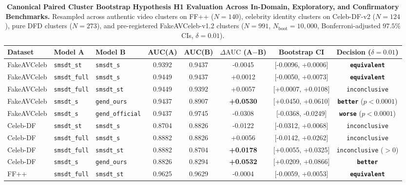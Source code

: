 \begin{table}[t]
\centering
\small
\caption{\textbf{Canonical Paired Cluster Bootstrap Hypothesis H1 Evaluation Across In-Domain, Exploratory, and Confirmatory Benchmarks.} Resampled across authentic video clusters on FF++ ($N=140$), celebrity identity clusters on Celeb-DF-v2 ($N=124$), pure DFD clusters ($N=273$), and pre-registered FakeAVCeleb-v1.2 clusters ($N=991$, $N_{\text{boot}}=10{,}000$, Bonferroni-adjusted $97.5\%$ CIs, $\delta=0.01$).}
\label{tab:h1_bootstrap}
\begin{tabular}{l l l c c c c c}
\toprule
\textbf{Dataset} & \textbf{Model A} & \textbf{Model B} & \textbf{AUC(A)} & \textbf{AUC(B)} & \textbf{$\Delta\text{AUC}$ (A$-$B)} & \textbf{Bootstrap CI} & \textbf{Decision ($\delta=0.01$)} \\
\midrule
FakeAVCeleb & \texttt{smsdt\_st}   & \texttt{smsdt\_s}    & 0.9392 & 0.9437 & -0.0045 & [-0.0096, +0.0006] & \textbf{\texttt{equivalent}} \\
FakeAVCeleb & \texttt{smsdt\_full} & \texttt{smsdt\_s}    & 0.9449 & 0.9437 & +0.0012 & [-0.0050, +0.0073] & \textbf{\texttt{equivalent}} \\
FakeAVCeleb & \texttt{smsdt\_full} & \texttt{smsdt\_st}   & 0.9449 & 0.9392 & +0.0057 & [+0.0007, +0.0108] & \texttt{inconclusive} \\
FakeAVCeleb & \texttt{smsdt\_s}    & \texttt{gend\_ours} & 0.9437 & 0.8907 & \textbf{+0.0530} & [+0.0450, +0.0610] & \textbf{\texttt{better}} ($p < 0.0001$) \\
FakeAVCeleb & \texttt{smsdt\_s}    & \texttt{gend\_official} & 0.9437 & 0.9745 & -0.0308 & [-0.0368, -0.0249] & \textbf{\texttt{worse}} ($p < 0.0001$) \\
\midrule
Celeb-DF & \texttt{smsdt\_st}   & \texttt{smsdt\_s}    & 0.8704 & 0.8826 & -0.0122 & [-0.0312, +0.0068] & \texttt{inconclusive} \\
Celeb-DF & \texttt{smsdt\_full} & \texttt{smsdt\_s}    & 0.8882 & 0.8826 & +0.0056 & [-0.0142, +0.0262] & \texttt{inconclusive} \\
Celeb-DF & \texttt{smsdt\_full} & \texttt{smsdt\_st}   & 0.8882 & 0.8704 & \textbf{+0.0178} & [+0.0055, +0.0325] & \texttt{inconclusive} ($>0$) \\
Celeb-DF & \texttt{smsdt\_s}    & \texttt{gend\_ours} & 0.8826 & 0.8294 & \textbf{+0.0532} & [+0.0209, +0.0866] & \textbf{\texttt{better}} \\
\midrule
FF++     & \texttt{smsdt\_full} & \texttt{smsdt\_st}   & 0.9625 & 0.9629 & -0.0004 & [-0.0059, +0.0053] & \textbf{\texttt{equivalent}} \\

\end{tabular}
\end{table}
